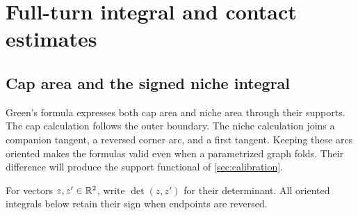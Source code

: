 \section{Full-turn integral and contact estimates}\label{app:full-turn-estimates}

\subsection{Cap area and the signed niche integral}

Green's formula expresses both cap area and niche area through their
supports. The cap calculation follows the outer boundary. The niche
calculation joins a companion tangent, a reversed corner arc, and a
first tangent. Keeping these arcs oriented makes the formulas valid
even when a parametrized graph folds. Their difference will produce
the support functional of \cref{sec:calibration}.

For vectors $z,z'\in\mathbb{R}^2$, write $\det(z,z')$ for their determinant.
All oriented integrals below retain their sign when endpoints are
reversed.

